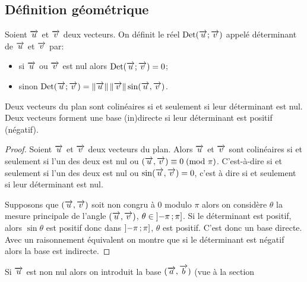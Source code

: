 \subsection{Définition géométrique}
\begin{defdef}
  Soient \(\overrightarrow{u}\) et \(\overrightarrow{v}\) deux vecteurs. On définit le réel \(\operatorname{Det}(\overrightarrow{u};\overrightarrow{v})\) appelé déterminant de \(\overrightarrow{u}\) et \(\overrightarrow{v}\) par:
  \begin{itemize}
  \item si \(\overrightarrow{u}\) ou \(\overrightarrow{v}\) est nul alors \(\operatorname{Det}(\overrightarrow{u};\overrightarrow{v})=0\);
  \item sinon \(\operatorname{Det}(\overrightarrow{u};\overrightarrow{v})=\left\lVert\overrightarrow{u}\right\rVert\left\lVert\overrightarrow{v}\right\rVert \sin(\overrightarrow{u},\overrightarrow{v})\).
  \end{itemize}
\end{defdef}
\begin{prop}
  Deux vecteurs du plan sont colinéaires si et seulement si leur déterminant est nul. Deux vecteurs forment une base (in)directe si leur déterminant est positif (négatif).
\end{prop}
\begin{proof}
  Soient \(\overrightarrow{u}\) et \(\overrightarrow{v}\) deux vecteurs du plan. Alors \(\overrightarrow{u}\) et \(\overrightarrow{v}\) sont colinéaires si et seulement si l'un des deux est nul ou \((\overrightarrow{u},\overrightarrow{v}) \equiv 0\!\pmod {\pi}\). C'est-à-dire si et seulement si l'un des deux est nul ou \( \sin(\overrightarrow{u},\overrightarrow{v}) = 0\), c'est à dire si et seulement si leur déterminant est nul.

  Supposons que \((\overrightarrow{u},\overrightarrow{v})\) soit non congru à 0 modulo \(\pi\) alors on considère \(\theta\) la mesure principale de l'angle \((\overrightarrow{u},\overrightarrow{v})\), \(\theta \in \left] -\pi \, ;  \pi \right]\). Si le déterminant est positif, alors \(\sin \theta\) est positif donc dans \(\left] -\pi \, ;  \pi  \right]\), \(\theta\) est positif. C'est donc un base directe. Avec un raisonnement équivalent on montre que si le déterminant est négatif alors la base est indirecte.
\end{proof}

Si \(\overrightarrow{u}\) est non nul alors on introduit la base \((\overrightarrow{a},\overrightarrow{b})\) (vue à la section~


